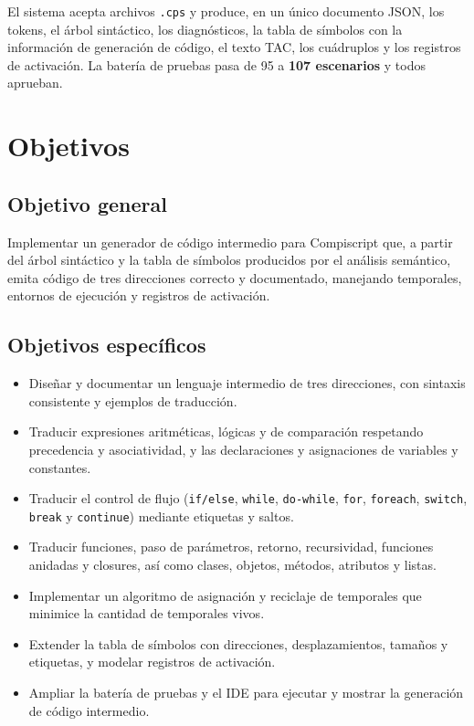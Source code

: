 \documentclass[11pt,a4paper]{article}
\begin{document}
El sistema acepta archivos \texttt{.cps} y produce, en un único documento JSON,
los tokens, el árbol sintáctico, los diagnósticos, la tabla de símbolos con la
información de generación de código, el texto TAC, los cuádruplos y los
registros de activación. La batería de pruebas pasa de 95 a \textbf{107
escenarios} y todos aprueban.

\section{Objetivos}

\subsection{Objetivo general}

Implementar un generador de código intermedio para Compiscript que, a partir
del árbol sintáctico y la tabla de símbolos producidos por el análisis
semántico, emita código de tres direcciones correcto y documentado, manejando
temporales, entornos de ejecución y registros de activación.

\subsection{Objetivos específicos}

\begin{itemize}[leftmargin=1.4em]
  \item Diseñar y documentar un lenguaje intermedio de tres direcciones, con
        sintaxis consistente y ejemplos de traducción.
  \item Traducir expresiones aritméticas, lógicas y de comparación respetando
        precedencia y asociatividad, y las declaraciones y asignaciones de
        variables y constantes.
  \item Traducir el control de flujo (\texttt{if/else}, \texttt{while},
        \texttt{do-while}, \texttt{for}, \texttt{foreach}, \texttt{switch},
        \texttt{break} y \texttt{continue}) mediante etiquetas y saltos.
  \item Traducir funciones, paso de parámetros, retorno, recursividad, funciones
        anidadas y closures, así como clases, objetos, métodos, atributos y
        listas.
  \item Implementar un algoritmo de asignación y reciclaje de temporales que
        minimice la cantidad de temporales vivos.
  \item Extender la tabla de símbolos con direcciones, desplazamientos, tamaños
        y etiquetas, y modelar registros de activación.
  \item Ampliar la batería de pruebas y el IDE para ejecutar y mostrar la
        generación de código intermedio.
\end{itemize}
\end{document}
